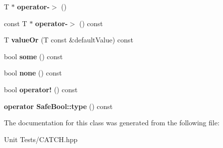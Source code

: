 \begin{DoxyCompactItemize}
\item 
T $\ast$ {\bfseries operator-\/$>$} ()\hypertarget{classCatch_1_1Option_acad340798a16c8f700f8763119e90f31}{}\label{classCatch_1_1Option_acad340798a16c8f700f8763119e90f31}

\item 
const T $\ast$ {\bfseries operator-\/$>$} () const \hypertarget{classCatch_1_1Option_a0800340b2971748671b88acfb14bb928}{}\label{classCatch_1_1Option_a0800340b2971748671b88acfb14bb928}

\item 
T {\bfseries value\+Or} (T const \&default\+Value) const \hypertarget{classCatch_1_1Option_a21b5629a7febbe3e23c475c9d9138a2d}{}\label{classCatch_1_1Option_a21b5629a7febbe3e23c475c9d9138a2d}

\item 
bool {\bfseries some} () const \hypertarget{classCatch_1_1Option_affa96f15798b4656fb753ff52d12dec2}{}\label{classCatch_1_1Option_affa96f15798b4656fb753ff52d12dec2}

\item 
bool {\bfseries none} () const \hypertarget{classCatch_1_1Option_a389324d2aa20ceb0eb0f48a5f77c20c8}{}\label{classCatch_1_1Option_a389324d2aa20ceb0eb0f48a5f77c20c8}

\item 
bool {\bfseries operator!} () const \hypertarget{classCatch_1_1Option_a47a1b6f6def2730ea9d27a1860a4f97f}{}\label{classCatch_1_1Option_a47a1b6f6def2730ea9d27a1860a4f97f}

\item 
{\bfseries operator Safe\+Bool\+::type} () const \hypertarget{classCatch_1_1Option_a637d4366ae7f0ded52ce59c8cb06da7b}{}\label{classCatch_1_1Option_a637d4366ae7f0ded52ce59c8cb06da7b}

\end{DoxyCompactItemize}


The documentation for this class was generated from the following file\+:\begin{DoxyCompactItemize}
\item 
Unit Tests/C\+A\+T\+C\+H.\+hpp\end{DoxyCompactItemize}
